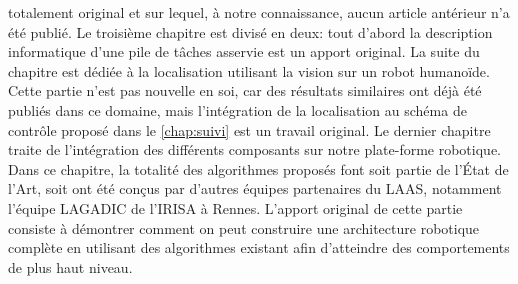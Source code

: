 totalement original et sur lequel, à notre connaissance, aucun article
antérieur n'a été publié. Le troisième chapitre est divisé en deux:
tout d'abord la description informatique d'une pile de tâches asservie
est un apport original. La suite du chapitre est dédiée à la
localisation utilisant la vision sur un robot humanoïde. Cette partie
n'est pas nouvelle en soi, car des résultats similaires ont déjà été
publiés dans ce domaine, mais l'intégration de la localisation au
schéma de contrôle proposé dans le \autoref{chap:suivi} est un travail
original. Le dernier chapitre traite de l'intégration des différents
composants sur notre plate-forme robotique. Dans ce chapitre, la
totalité des algorithmes proposés font soit partie de l'État de l'Art,
soit ont été conçus par d'autres équipes partenaires du LAAS,
notamment l'équipe \mbox{LAGADIC} de l'IRISA à Rennes. L'apport
original de cette partie consiste à démontrer comment on peut
construire une architecture robotique complète en utilisant des
algorithmes existant afin d'atteindre des comportements de plus haut
niveau.

